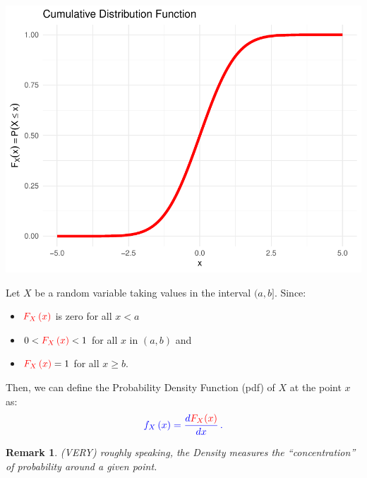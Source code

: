 \documentclass[notes=show,smaller]{beamer}\usepackage[]{graphicx}\usepackage[]{color}
\newenvironment{knitrout}{}{} %
\newtheorem{remark}{Remark}[section]
\begin{document}
\begin{frame}{\secname}
\begin{knitrout}
\color{fgcolor}

{\centering \includegraphics[width=0.8\linewidth]{figure/unnamed-chunk-7-1} 

}



\end{knitrout}
\end{frame}

\begin{frame}{\secname}
  \begin{definition}
  Let $X$ be a random variable taking values in the interval $(a,b]$. Since:
  \medskip

  \begin{itemize}
  \item $\color{red}F_{X}\left( x\right)\color{black} $ is zero for all $x<a$ \medskip
  \item $0<\color{red}F_{X}\left( x\right)\color{black}<1 $ for all $x$ in $(a,b)$ and \medskip
  \item $\color{red}F_{X}\left( x\right)\color{black}=1 $ for all $x\geq b$.
  \end{itemize}

  \medskip

  Then, we can define the Probability Density Function (\color{blue}pdf\color{black}) of $X$ at the point $x$ as:
  \begin{equation*}
  \color{blue}{f_{X}\left( x\right) =\frac{d\color{red}F_{X}(x)\color{black}}{dx}}\,.
  \end{equation*}
  \end{definition}

  \begin{remark}
  (VERY) roughly speaking, the Density measures the ``concentration'' of
  probability around a given point.
  \end{remark}

\end{frame}
\end{document}
